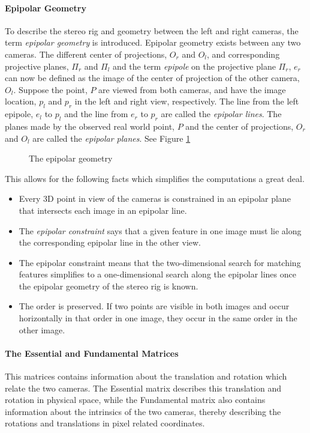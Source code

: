 \paragraph{Epipolar Geometry}
To describe the stereo rig and geometry between the left and right cameras, the term
\emph{epipolar geometry} is introduced. Epipolar geometry exists between any two cameras.
The different center of projections, $O_r$ and $O_l$, and corresponding
projective planes, $\Pi_r$ and $\Pi_l$ and the term \emph{epipole} on the projective plane
$\Pi_r$, $e_r$ can now be defined as the image of the center of projection of the other 
camera, $O_l$. Suppose the point, $P$ are viewed from both cameras, and have the image
location, $p_l$ and $p_r$ in the left and right view, respectively. The line from the left
epipole, $e_l$ to $p_l$ and the line from $e_r$ to $p_r$ are called the \emph{epipolar
lines}. The planes made by the observed real world point, $P$ and the center of
projections, $O_r$ and $O_l$ are called the \emph{epipolar planes}. See Figure
\ref{chap2:fig-epipolarGeometry}
\begin{figure}[htbp]
    \centering
    \caption{The epipolar geometry}
    \label{chap2:fig-epipolarGeometry}
\end{figure}

This allows for the following facts which simplifies the computations a great deal.
\cite{epipolar}
\begin{itemize}
    \item Every 3D point in view of the cameras is constrained in an epipolar plane that
        intersects each image in an epipolar line.
    \item The \emph{epipolar constraint} says that a given feature in one image must lie
        along the corresponding epipolar line in the other view.
    \item The epipolar constraint means that the two-dimensional search for matching
        features simplifies to a one-dimensional search along the epipolar lines once the
        epipolar geometry of the stereo rig is known.
    \item The order is preserved. If two points are visible in both images and occur
        horizontally in that order in one image, they occur in the same order in the other
        image.
\end{itemize}

\paragraph{The Essential and Fundamental Matrices}
This matrices contains information about the translation and rotation which relate the
two cameras. The Essential matrix describes this translation and rotation in physical
space, while the Fundamental matrix also contains information about the intrinsics of the
two cameras, thereby describing the rotations and translations in pixel related
coordinates.

